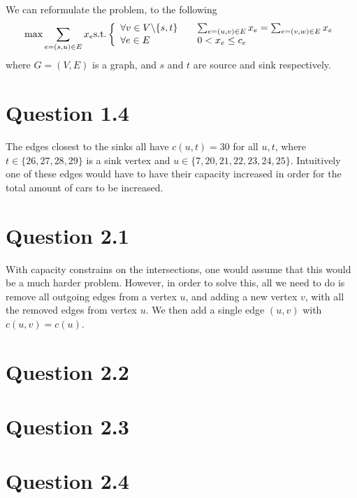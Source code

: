 \documentclass[10pt]{article}
\begin{document}
We can reformulate the problem, to the following
\begin{equation}
	\text{max} \sum_{e=(s,u) \in E} x_e \text{s.t.} \left\{
	\begin{array}{l l}
		\forall v \in V\backslash\{s,t\} & \quad \sum_{e=(u,v) \in E} x_e = \sum_{e=(v,w) \in E} x_e \\
		\forall e \in E & \quad 0 < x_e \leq c_e
	\end{array} \right.
\end{equation}
where $G = (V, E)$ is a graph, and $s$ and $t$ are source and sink respectively.

\section*{Question 1.4} %
\label{sec:question_1_4}
The edges closest to the sinks all have $c(u,t) = 30$ for all $u,t$, where $t \in \{26, 27, 28, 29\}$ is a sink vertex and $u \in \{7, 20, 21, 22, 23, 24, 25\}$. 
Intuitively one of these edges would have to have their capacity increased in order for the total amount of cars to be increased.


\section*{Question 2.1} %
\label{sec:question_2_1}
With capacity constrains on the intersections, one would assume that this would be a much harder problem.
However, in order to solve this, all we need to do is remove all outgoing edges from a vertex $u$, and adding a new vertex $v$, with all the removed edges from vertex $u$.
We then add a single edge $(u,v)$ with $c(u, v) = c(u)$.

\section*{Question 2.2} %
\label{sec:question_2_2}


\section*{Question 2.3} %
\label{sec:question_2_3}


\section*{Question 2.4} %
\label{sec:question_2_4}
\end{document}
